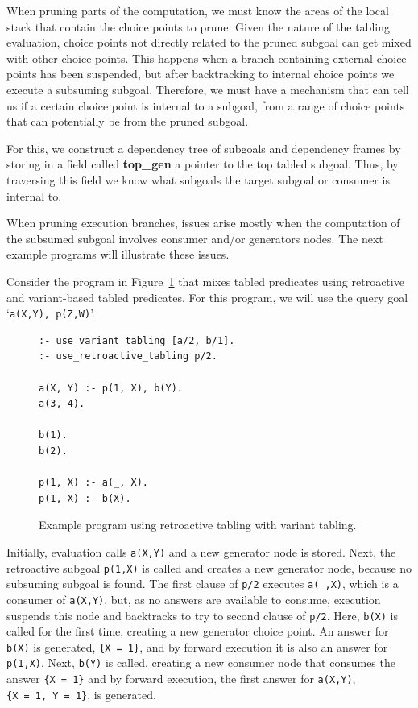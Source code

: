 When pruning parts of the computation, we must know the areas of the local stack
that contain the choice points to prune. Given the nature of the tabling evaluation, choice points not
directly related to the pruned subgoal can get mixed with other choice points. This happens when a branch
containing external choice points has been suspended, but after backtracking to internal choice points we
execute a subsuming subgoal. Therefore, we must have a mechanism that can tell us if a certain choice
point is internal to a subgoal, from a range of choice points that can potentially be from
the pruned subgoal.

For this, we construct a dependency tree of subgoals and dependency frames by storing in a field
called \textbf{top\_gen} a pointer to the top tabled subgoal. Thus, by traversing this field we know
what subgoals the target subgoal or consumer is internal to.

When pruning execution branches, issues arise mostly when the computation of the subsumed subgoal involves
consumer and/or generators nodes. The next example programs will illustrate these issues.

Consider the program in Figure~\ref{fig:retro_program2} that mixes tabled predicates using retroactive
and variant-based tabled predicates.
For this program, we will use the query goal `\texttt{a(X,Y),~p(Z,W)}'.

\begin{figure}[ht]
\begin{Verbatim}
:- use_variant_tabling [a/2, b/1].
:- use_retroactive_tabling p/2.

a(X, Y) :- p(1, X), b(Y).
a(3, 4).

b(1).
b(2).

p(1, X) :- a(_, X).
p(1, X) :- b(X).
\end{Verbatim}
\caption{Example program using retroactive tabling with variant tabling.}
\label{fig:retro_program2}
\end{figure}

Initially, evaluation calls \texttt{a(X,Y)} and a new generator node is stored. Next, the retroactive subgoal
\texttt{p(1,X)} is called and creates a new generator node, because no subsuming subgoal is found.
The first clause of \texttt{p/2} executes \texttt{a(\_,X)}, which is a consumer of \texttt{a(X,Y)}, but, as
no answers are available to consume, execution suspends this node and backtracks to try to second clause
of \texttt{p/2}. Here, \texttt{b(X)} is called for the first time, creating a new generator choice point.
An answer for \texttt{b(X)} is generated, \texttt{\{X~=~1\}}, and by forward execution it is also an answer
for \texttt{p(1,X)}. Next, \texttt{b(Y)} is called, creating a new consumer node that consumes the answer
\texttt{\{X~=~1\}} and by forward execution, the first answer for \texttt{a(X,Y)}, \texttt{\{X~=~1,~Y~=~1\}},
is generated.

